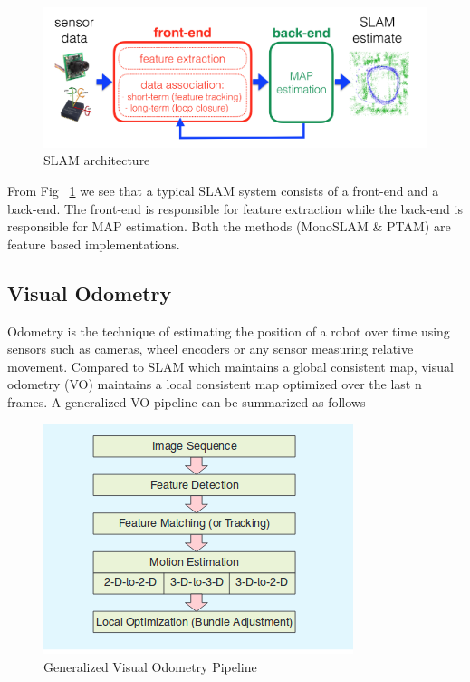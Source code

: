 \begin{figure}
  \includegraphics[width=\textwidth]{./figures/slam_model.png}
\caption{SLAM architecture}
\label{fig:slammodel}       %
\end{figure}

From Fig ~\ref{fig:slammodel} we see that a typical SLAM system consists of a front-end and a back-end. The front-end is responsible for feature extraction while the back-end is responsible for MAP estimation. Both the methods (MonoSLAM \& PTAM) are feature based implementations. 

\subsection{Visual Odometry}

Odometry is the technique of estimating the position of a robot over time using sensors such as cameras,  wheel encoders or any sensor measuring relative movement. Compared to SLAM which maintains a global consistent map, visual odometry (VO) maintains a local consistent map optimized over the last n frames. A generalized VO pipeline can be summarized as follows

\begin{figure}[!htb]
  \includegraphics[width=\textwidth]{./figures/vo.png}
\caption{Generalized Visual Odometry Pipeline}
\label{fig:vo}       %
\end{figure}

